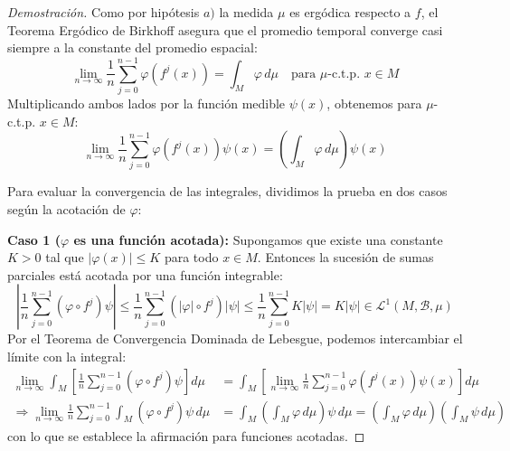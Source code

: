 \begin{proof}[Demostración]
	Como por hipótesis $a)$ la medida $\mu$ es ergódica respecto a $f$, el Teorema Ergódico de Birkhoff asegura que el promedio temporal converge casi siempre a la constante del promedio espacial:
	$$ \lim_{n \to \infty} \frac{1}{n} \sum_{j=0}^{n-1} \varphi(f^j(x)) = \int_M \varphi \, d\mu \quad \text{para } \mu\text{-c.t.p. } x \in M $$
	Multiplicando ambos lados por la función medible $\psi(x)$, obtenemos para $\mu$-c.t.p. $x \in M$:
	$$ \lim_{n \to \infty} \frac{1}{n} \sum_{j=0}^{n-1} \varphi(f^j(x))\psi(x) = \left( \int_M \varphi \, d\mu \right) \psi(x) $$
	
	Para evaluar la convergencia de las integrales, dividimos la prueba en dos casos según la acotación de $\varphi$:
	
	\textbf{Caso 1 ($\varphi$ es una función acotada):} Supongamos que existe una constante $K > 0$ tal que $|\varphi(x)| \le K$ para todo $x \in M$. Entonces la sucesión de sumas parciales está acotada por una función integrable:
	$$ \left| \frac{1}{n} \sum_{j=0}^{n-1} (\varphi \circ f^j)\psi \right| \le \frac{1}{n} \sum_{j=0}^{n-1} (|\varphi| \circ f^j)|\psi| \le \frac{1}{n} \sum_{j=0}^{n-1} K|\psi| = K|\psi| \in \mathcal{L}^1(M, \mathcal{B}, \mu) $$
	Por el Teorema de Convergencia Dominada de Lebesgue, podemos intercambiar el límite con la integral:
	\begin{align*}
		\lim_{n \to \infty} \int_M \left[ \frac{1}{n} \sum_{j=0}^{n-1} (\varphi \circ f^j)\psi \right] d\mu &= \int_M \left[ \lim_{n \to \infty} \frac{1}{n} \sum_{j=0}^{n-1} \varphi(f^j(x))\psi(x) \right] d\mu \\
		\Longrightarrow \lim_{n \to \infty} \frac{1}{n} \sum_{j=0}^{n-1} \int_M (\varphi \circ f^j)\psi \, d\mu &= \int_M \left( \int_M \varphi \, d\mu \right) \psi \, d\mu = \left( \int_M \varphi \, d\mu \right) \left( \int_M \psi \, d\mu \right)
	\end{align*}
	con lo que se establece la afirmación para funciones acotadas.
	

\end{proof}
